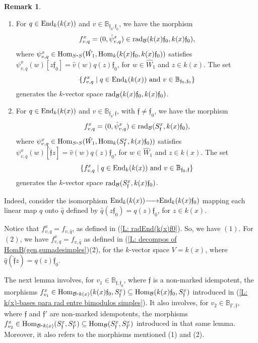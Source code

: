 \documentclass{article}
\theoremstyle{definition}
\newtheorem{remark}[theorem]{Remark}
\newcommand{\End}{{ \rm End }}
\newcommand{\Hom}{{ \rm Hom }}
\newcommand{\rad}{{ \rm rad }}
\renewcommand{\frak}{\mathfrak}
\newcommand{\g}{\hbox{-}}
\newcommand{\hueca}[1]{\mathbb{#1}}
\newcommand{\rightmap}[1]{\smash{\mathop{\hbox to 
20pt{\rightarrowfill}}\limits^{#1}}}
\begin{document}
\begin{remark}\label{L: generadores de End_calB(k(x)f_0)}
\begin{enumerate}
\item For $q\in \End_k(k(x))$ and $v\in \hueca{B}_{\frak{f}_0,\frak{f}_0}$, we have the morphism  
$$f^x_{v,q}=(0,\hat{\psi}^x_{v,q})\in \rad_{\cal B}(k(x)\frak{f}_0,k(x)\frak{f}_0),$$
where $\psi^x_{v,q}\in \Hom_{S\g S}(\hat{W_1},\Hom_k(k(x)\frak{f}_0,k(x)\frak{f}_0))$ satisfies $\psi^x_{v,q}(w)[z\frak{f}_0]=\hat{v}(w)q(z)\frak{f}_0$, for $w\in \hat{W}_1$ and $z\in k(x)$. 
The set 
$$\{ f_{v,q}^x\mid q\in \End_k(k(x))\hbox{ and } v\in \hueca{B}_{\frak{f}_0,\frak{f}_0}\}$$
generates the $k$-vector space $\rad_{\cal B}(k(x)\frak{f}_0,k(x)\frak{f}_0)$.
\item For $q\in \End_k(k(x))$ and $v\in \hueca{B}_{\frak{f}_0,\frak{f}}$, with $\frak{f}\not=\frak{f}_0$, we have the morphism  
$$f^x_{v,q}=(0,\hat{\psi}^x_{v,q})\in \rad_{\cal B}(S^x_\frak{f},k(x)\frak{f}_0),$$
where $\psi^x_{v,q}\in \Hom_{S\g S}(\hat{W_1},\Hom_k(S^x_\frak{f},k(x)\frak{f}_0))$ satisfies $\psi^x_{v,q}(w)[\hat{\frak{f}}z]=\hat{v}(w)q(z)\frak{f}_0$, for $w\in \hat{W}_1$ and $z\in k(x)$.  
The set 
$$\{ f_{v,q}^x\mid q\in \End_k(k(x))\hbox{ and } v\in \hueca{B}_{\frak{f}_0,\frak{f}}\}$$
generates the $k$-vector space $\rad_{\cal B}(S^x_\frak{f},k(x)\frak{f}_0)$.
\end{enumerate}
\medskip

Indeed, consider the isomorphism $\End_k(k(x))\rightmap{}\End_k(k(x)\frak{f}_0)$ mapping each linear map $q$ onto $\hat{q}$ defined by $\hat{q}(z\frak{f}_0)=q(z)\frak{f}_0$, for $z\in k(x)$.

Notice that $f_{v,q}^x=f_{v,\hat{q}}$, as defined in (\ref{L: radEnd(k(x)f0}). So, we have $(1)$. For $(2)$, we have $f^x_{v,q}=f_{v,\hat{q}}$ as defined in (\ref{L: decompos of HomB(gen,sumadesimples})(2), for the $k$-vector space $V=k(x)$, where $\hat{q}(\hat{\frak{f}}z)=q(z)\frak{f}_0$. 



The next lemma involves, for $v_1\in \hueca{B}_{\frak{f},\frak{f}_0}$, where $\frak{f}$ is a non-marked idempotent, the morphisms 
$f^x_{v_1}\in \Hom_{{\cal B}\g k(x)}(k(x)\frak{f}_0,S^x_\frak{f})\subseteq \Hom_{{\cal B}}(k(x)\frak{f}_0,S^x_\frak{f})$ introduced in (\ref{L: k(x)-bases para rad entre bimodulos simples}). It also  involves, for $v_2\in \hueca{B}_{\frak{f}',\frak{f}}$, where $\frak{f}$ and $\frak{f}'$ are non-marked idempotents, the morphisms 
$f^x_{v_2}\in \Hom_{{\cal B}\g k(x)}(S^x_\frak{f},S^x_{\frak{f}'})\subseteq \Hom_{{\cal B}}(S^x_\frak{f},S^x_{\frak{f}'})$ introduced in that same lemma. 
Moreover, it also refers to the  morphisms  mentioned (1) and (2). 
\end{remark}
\end{document}
